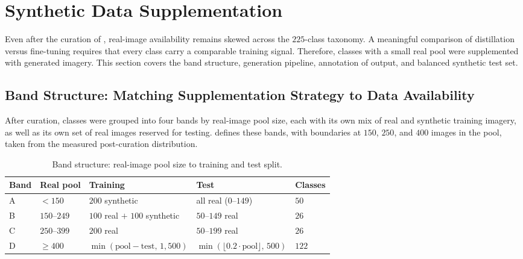 \section{Synthetic Data Supplementation}\label{sec:synthetic_data_supplementation}

Even after the curation of , real-image availability remains skewed across the $225$-class taxonomy. A meaningful comparison of distillation versus fine-tuning requires that every class carry a comparable training signal. Therefore, classes with a small real pool were supplemented with generated imagery. This section covers the band structure, generation pipeline, annotation of output, and balanced synthetic test set.

\subsection{Band Structure: Matching Supplementation Strategy to Data Availability}\label{sec:band_structure}

After curation, classes were grouped into four bands by real-image pool size, each with its own mix of real and synthetic training imagery, as well as its own set of real images reserved for testing.  defines these bands, with boundaries at $150$, $250$, and $400$ images in the pool, taken from the measured post-curation distribution.

\begin{table}[htbp]
\centering
\caption{Band structure: real-image pool size to training and test split.}
\label{tab:band-structure}
\begin{tabular}{@{}lllll@{}}
\toprule
Band & Real pool & Training & Test & Classes \\
\midrule
A & $< 150$ & $200$ synthetic & all real ($0$--$149$) & $50$ \\
B & $150$--$249$ & $100$ real $+$ $100$ synthetic & $50$--$149$ real & $26$ \\
C & $250$--$399$ & $200$ real & $50$--$199$ real & $26$ \\
D & $\geq 400$ & $\min(\text{pool} - \text{test},\,1{,}500)$ & $\min(\lfloor 0.2 \cdot \text{pool} \rfloor,\,500)$ & $122$ \\
\bottomrule
\end{tabular}
\end{table}

